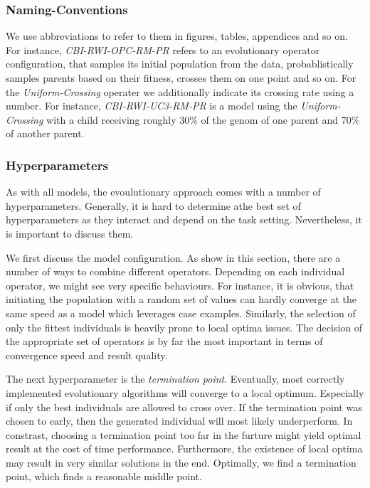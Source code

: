 \documentclass[./../../paper.tex]{subfiles}
\begin{document}
\subsubsection{Naming-Conventions}
We use abbreviations to refer to them in figures, tables, appendices and so on. For instance, \emph{CBI-RWI-OPC-RM-PR} refers to an evolutionary operator configuration, that samples its initial population from the data, probablistically samples parents based on their fitness, crosses them on one point and so on. For the \emph{Uniform-Crossing} operater we additionally indicate its crossing rate using a number. For instance,  \emph{CBI-RWI-UC3-RM-PR} is a model using the \emph{Uniform-Crossing} with a child receiving roughly 30\% of the genom of one parent and 70\% of another parent.

\subsubsection{Hyperparameters}
As with all models, the evoulutionary approach comes with a number of hyperparameters. Generally, it is hard to determine athe best set of hyperparameters as they interact and depend on the task setting. Nevertheless, it is important to discuss them.

We first discuss the model configuration. As show in this section, there are a number of ways to combine different operators. Depending on each individual operator, we might see very specific behaviours. For instance, it is obvious, that initiating the population with a random set of values can hardly converge at the same speed as a model which leverages case examples. Similarly, the selection of only the fittest individuals is heavily prone to local optima issues. The decision of the appropriate set of operators is by far the most important in terms of convergence speed and result quality.

The next hyperparameter is the \emph{termination point}. Eventually, most correctly implemented evolutionary algorithms will converge to a local optimum. Especially if only the best individuals are allowed to cross over. If the termination point was chosen to early, then the generated individual will most likely underperform. In constrast, choosing a termination point too far in the furture might yield optimal result at the cost of time performance. Furthermore, the existence of local optima may result in very similar solutions in the end. Optimally, we find a termination point, which finds a reasonable middle point.
\end{document}
